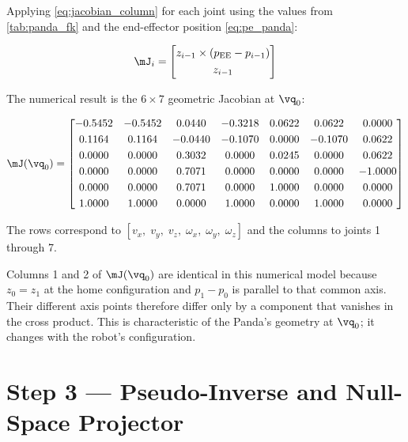 Applying \cref{eq:jacobian_column} for each joint using the values from
\cref{tab:panda_fk} and the end-effector position \cref{eq:pe_panda}:

\begin{equation}
\mJ_i =
\begin{bmatrix}
z_{i-1} \times
(p_{\mathrm{EE}} - p_{i-1}) \\[3pt]
z_{i-1}
\end{bmatrix}
\end{equation}

The numerical result is the $6\times7$ geometric Jacobian at $\vq_0$:

\begin{equation}
\label{eq:J_panda}
\mJ(\vq_0) =
\begin{bmatrix}
-0.5452 & -0.5452 &  0.0440 & -0.3218 &  0.0622 &  0.0622 &  0.0000 \\[3pt]
 0.1164 &  0.1164 & -0.0440 & -0.1070 &  0.0000 & -0.1070 &  0.0622 \\[3pt]
 0.0000 &  0.0000 &  0.3032 &  0.0000 &  0.0245 &  0.0000 &  0.0622 \\[3pt]
 0.0000 &  0.0000 &  0.7071 &  0.0000 &  0.0000 &  0.0000 & -1.0000 \\[3pt]
 0.0000 &  0.0000 &  0.7071 &  0.0000 &  1.0000 &  0.0000 &  0.0000 \\[3pt]
 1.0000 &  1.0000 &  0.0000 &  1.0000 &  0.0000 &  1.0000 &  0.0000
\end{bmatrix}
\end{equation}

The rows correspond to $[v_x,\;v_y,\;v_z,\;\omega_x,\;\omega_y,\;\omega_z]$
and the columns to joints 1 through 7.

\begin{remark}
Columns 1 and 2 of $\mJ(\vq_0)$ are identical in this numerical model because
\(z_0=z_1\) at the home configuration and \(p_1-p_0\) is parallel to that
common axis. Their different axis points therefore differ only by a component
that vanishes in the cross product.
This is characteristic of the Panda's geometry at $\vq_0$; it changes with the
robot's configuration.
\end{remark}

\section{Step 3 --- Pseudo-Inverse and Null-Space Projector}
\label{app:panda_pinv}

